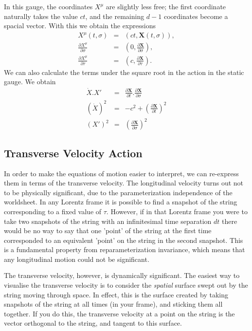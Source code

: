 \documentclass[a4paper,12pt]{article}
\numberwithin{equation}{section}
\begin{document}
In this gauge, the coordinates $X^\mu$ are slightly less free; the first coordinate naturally takes the value $ct$, and the remaining $d-1$ coordinates become a spacial vector. With this we obtain the expressions
\begin{eqnarray}
X^\mu(t,\sigma) & = & (ct, \mathbf{X}(t,\sigma)), \\
\frac{\partial X^\mu}{\partial \sigma} & = & \left(0,\frac{\partial \mathbf{X}}{\partial\sigma}\right), \\
\frac{\partial X^\mu}{\partial \tau} & = & \left(c, \frac{\partial \mathbf{X}}{\partial \tau}\right) .
\end{eqnarray}
We can also calculate the terms under the square root in the action in the static gauge. We obtain
\begin{eqnarray}
\dot{X}.X' & = & \frac{\partial \mathbf{X}}{\partial t}.\frac{\partial \mathbf{X}}{\partial \sigma}\label{foo1} \\
(\dot{X})^2 & =& -c^2 + \left(\frac{\partial \mathbf{X}}{\partial t}\right)^2 \\
(X')^2 & = & \left(\frac{\partial \mathbf{X}}{\partial \sigma}\right)^2\label{foo2}
\end{eqnarray}
\subsection{Transverse Velocity Action}
In order to make the equations of motion easier to interpret, we can re-express them in terms of the transverse velocity. The longitudinal velocity turns out not to be physically significant, due to the parameterization independence of the worldsheet. In any Lorentz frame it is possible to find a snapshot of the string corresponding to a fixed value of $\tau$. However, if in that Lorentz frame you were to take two snapshots of the string with an infinitesimal time separation $dt$ there would be no way to say that one 'point' of the string at the first time corresponded to an equivalent 'point' on the string in the second snapshot. This is a fundamental property from reparameterization invariance, which means that any longitudinal motion could not be significant.

The transverse velocity, however, is dynamically significant. The easiest way to visualise the transverse velocity is to consider the \emph{spatial} surface swept out by the string moving through space. In effect, this is the surface created by taking snapshots of the string at all times (in your frame), and sticking them all together. If you do this, the transverse velocity at a point on the string is the vector orthogonal to the string, and tangent to this surface.
\end{document}
